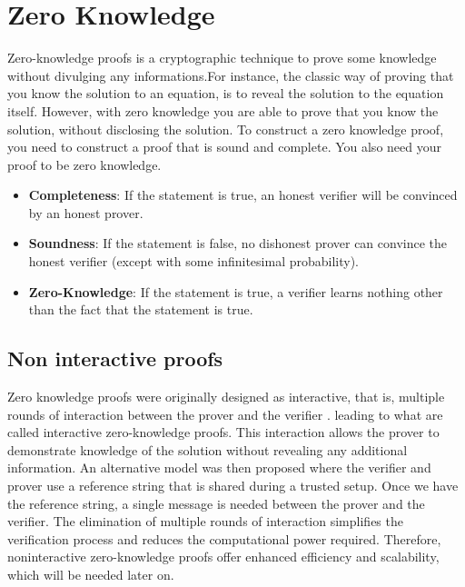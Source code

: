 \section{Zero Knowledge}


Zero-knowledge proofs is a cryptographic technique to prove some knowledge without divulging any informations.For instance,
the classic way of proving that you know the solution to an equation, is to reveal the solution to the equation itself.
However, with zero knowledge you are able to prove that you know the solution, without disclosing the solution.
To construct a zero knowledge proof, you need to construct a proof that is sound and complete. You also need your proof to be zero knowledge\cite{LZK}.


\begin{itemize}


   \item \textbf{Completeness}: If the statement is true, an honest verifier will be convinced by an honest prover.
  
   \item \textbf{Soundness}: If the statement is false, no dishonest prover can convince the honest verifier (except with some infinitesimal probability).
  
   \item \textbf{Zero-Knowledge}: If the statement is true,  a verifier learns nothing other than the fact that the statement is true. \cite{LC23}
  
   \end{itemize}


   \subsection{Non interactive proofs}






Zero knowledge proofs were originally designed as interactive, that is, multiple rounds of interaction between the prover and the verifier \cite{GMR89}.
leading to what are called interactive zero-knowledge proofs. This interaction allows the prover to demonstrate knowledge of the solution without revealing any additional information.
An alternative model was then proposed where the verifier and prover use a reference string that is shared during a trusted setup. Once we have the reference string, a single message is needed between the prover and the verifier.
The elimination of multiple rounds of interaction simplifies the verification process and reduces the computational power required.
Therefore, noninteractive zero-knowledge proofs offer enhanced efficiency and scalability, which will be needed later on.  \cite{BFM88} \cite{GMW91}





